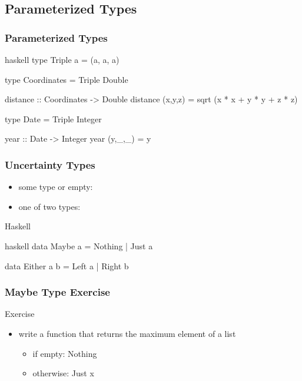 \documentclass[dvipsnames]{beamer}
\theoremstyle{plain}
\begin{document}
\subsection{Parameterized Types}

\begin{frame}[fragile]
  \frametitle{Parameterized Types}

  \begin{example}[Haskell]
    \begin{pygments}{haskell}
type Triple a = (a, a, a)

type Coordinates = Triple Double

distance :: Coordinates -> Double
distance (x,y,z) = sqrt (x * x + y * y + z * z)

type Date = Triple Integer

year :: Date -> Integer
year (y,_,_) = y
    \end{pygments}
  \end{example}
\end{frame}

\begin{frame}[fragile]
  \frametitle{Uncertainty Types}

  \begin{itemize}
    \item some type or empty: 
    \item one of two types: 
  \end{itemize}

  \begin{block}{Haskell}
    \begin{pygments}{haskell}
data Maybe a = Nothing | Just a

data Either a b = Left a | Right b
    \end{pygments}
  \end{block}
\end{frame}

\begin{frame}
  \frametitle{Maybe Type Exercise}

  \begin{block}{Exercise}
    \begin{itemize}
      \item write a function that returns the maximum element of a list
      \begin{itemize}
        \item if empty: Nothing
        \item otherwise: Just x
      \end{itemize}
    \end{itemize}
  \end{block}
\end{frame}
\end{document}
